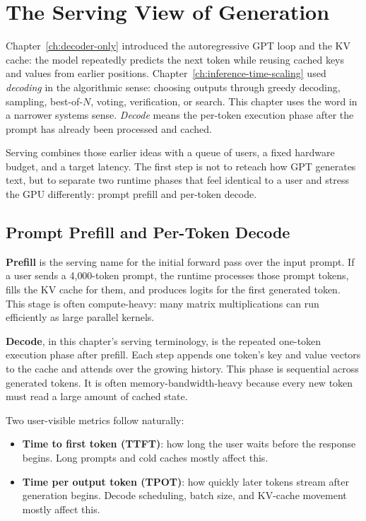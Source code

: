 \section{The Serving View of Generation}
\label{sec:ch19-serving-view}

Chapter~\ref{ch:decoder-only} introduced the autoregressive GPT loop and the KV cache: the model repeatedly predicts the next token while reusing cached keys and values from earlier positions. Chapter~\ref{ch:inference-time-scaling} used \emph{decoding} in the algorithmic sense: choosing outputs through greedy decoding, sampling, best-of-$N$, voting, verification, or search. This chapter uses the word in a narrower systems sense. \emph{Decode} means the per-token execution phase after the prompt has already been processed and cached.

Serving combines those earlier ideas with a queue of users, a fixed hardware budget, and a target latency. The first step is not to reteach how GPT generates text, but to separate two runtime phases that feel identical to a user and stress the GPU differently: prompt prefill and per-token decode.

\subsection{Prompt Prefill and Per-Token Decode}

\textbf{Prefill} is the serving name for the initial forward pass over the input prompt. If a user sends a 4{,}000-token prompt, the runtime processes those prompt tokens, fills the KV cache for them, and produces logits for the first generated token. This stage is often compute-heavy: many matrix multiplications can run efficiently as large parallel kernels.

\textbf{Decode}, in this chapter's serving terminology, is the repeated one-token execution phase after prefill. Each step appends one token's key and value vectors to the cache and attends over the growing history. This phase is sequential across generated tokens. It is often memory-bandwidth-heavy because every new token must read a large amount of cached state.

Two user-visible metrics follow naturally:

\begin{itemize}[nosep]
  \item \textbf{Time to first token (TTFT)}: how long the user waits before the response begins. Long prompts and cold caches mostly affect this.
  \item \textbf{Time per output token (TPOT)}: how quickly later tokens stream after generation begins. Decode scheduling, batch size, and KV-cache movement mostly affect this.
\end{itemize}

